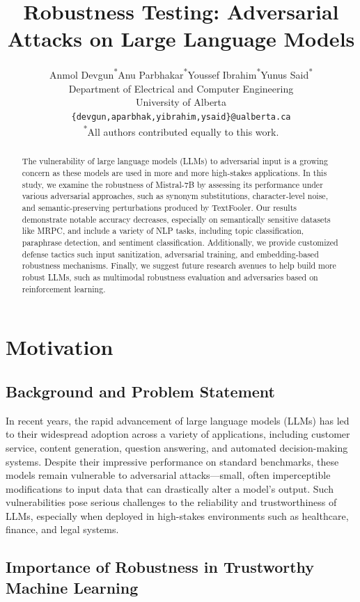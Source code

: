 \documentclass[conference]{IEEEtran}
\title{Robustness Testing: Adversarial Attacks on Large Language Models}
\author{
Anmol Devgun\textsuperscript{*}\quad Anu Parbhakar\textsuperscript{*}\quad Youssef Ibrahim\textsuperscript{*}\quad Yunus Said\textsuperscript{*} \\
Department of Electrical and Computer Engineering \\
University of Alberta \\
\texttt{\{devgun,aparbhak,yibrahim,ysaid\}@ualberta.ca} \\
\textsuperscript{*}All authors contributed equally to this work.
}
\begin{document}
\maketitle

\begin{abstract}
The vulnerability of large language models (LLMs) to adversarial input is a growing concern as these models are used in more and more high-stakes applications.  In this study, we examine the robustness of Mistral-7B by assessing its performance under various adversarial approaches, such as synonym substitutions, character-level noise, and semantic-preserving perturbations produced by TextFooler.  Our results demonstrate notable accuracy decreases, especially on semantically sensitive datasets like MRPC, and include a variety of NLP tasks, including topic classification, paraphrase detection, and sentiment classification.  Additionally, we provide customized defense tactics such input sanitization, adversarial training, and embedding-based robustness mechanisms.  Finally, we suggest future research avenues to help build more robust LLMs, such as multimodal robustness evaluation and adversaries based on reinforcement learning.
\end{abstract}


\section{Motivation}


\subsection{Background and Problem Statement}

In recent years, the rapid advancement of large language models (LLMs) has led to their widespread adoption across a variety of applications, including customer service, content generation, question answering, and automated decision-making systems. Despite their impressive performance on standard benchmarks, these models remain vulnerable to adversarial attacks—small, often imperceptible modifications to input data that can drastically alter a model's output. Such vulnerabilities pose serious challenges to the reliability and trustworthiness of LLMs, especially when deployed in high-stakes environments such as healthcare, finance, and legal systems.

\subsection{Importance of Robustness in Trustworthy Machine Learning}
\end{document}
